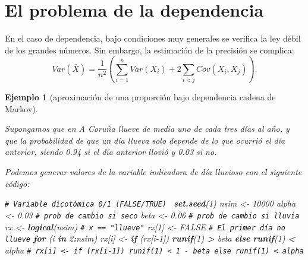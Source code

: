 \documentclass[
  spanish,
  10pt,
]{book}
\newenvironment{Shaded}{\begin{snugshade}}{\end{snugshade}}
\newcommand{\CommentTok}[1]{\textcolor[rgb]{0.56,0.35,0.01}{\textit{#1}}}
\newcommand{\ConstantTok}[1]{\textcolor[rgb]{0.56,0.35,0.01}{#1}}
\newcommand{\ControlFlowTok}[1]{\textcolor[rgb]{0.13,0.29,0.53}{\textbf{#1}}}
\newcommand{\DecValTok}[1]{\textcolor[rgb]{0.00,0.00,0.81}{#1}}
\newcommand{\FloatTok}[1]{\textcolor[rgb]{0.00,0.00,0.81}{#1}}
\newcommand{\FunctionTok}[1]{\textcolor[rgb]{0.13,0.29,0.53}{\textbf{#1}}}
\newcommand{\NormalTok}[1]{#1}
\newcommand{\OtherTok}[1]{\textcolor[rgb]{0.56,0.35,0.01}{#1}}
\newcommand{\SpecialCharTok}[1]{\textcolor[rgb]{0.81,0.36,0.00}{\textbf{#1}}}
\theoremstyle{break}
\newtheorem{example}{Ejemplo}[chapter]
\theoremstyle{nonumberplain}
\renewcommand{\CommentTok}[1]{\textcolor[rgb]{0.41,0.41,0.41}{\texttt{#1}}}
\begin{document}
\section{El problema de la dependencia}\label{el-problema-de-la-dependencia}

En el caso de dependencia, bajo condiciones muy generales se verifica la ley débil de los grandes números.
Sin embargo, la estimación de la precisión se complica:
\[Var\left( \overline{X}\right) =\frac{1}{n^{2}}\left( 
\sum_{i=1}^{n}Var\left( X_{i} \right) + 2\sum_{i<j}Cov\left( X_{i},X_{j}\right) \right).\]

\begin{example}[aproximación de una proporción bajo dependencia cadena de Markov]
\protect\hypertarget{exm:mmc}{}\label{exm:mmc}

Supongamos que en A Coruña llueve de media uno de cada tres días al año,
y que la probabilidad de que un día llueva solo depende de lo que ocurrió el día anterior,
siendo 0.94 si el día anterior llovió y 0.03 si no.

Podemos generar valores de la variable indicadora de día lluvioso con el siguiente código:

\begin{Shaded}
\begin{Highlighting}[]
\CommentTok{\# Variable dicotómica 0/1 (FALSE/TRUE)  }
\FunctionTok{set.seed}\NormalTok{(}\DecValTok{1}\NormalTok{)}
\NormalTok{nsim }\OtherTok{\textless{}{-}} \DecValTok{10000}
\NormalTok{alpha }\OtherTok{\textless{}{-}} \FloatTok{0.03} \CommentTok{\# prob de cambio si seco}
\NormalTok{beta }\OtherTok{\textless{}{-}} \FloatTok{0.06}  \CommentTok{\# prob de cambio si lluvia}
\NormalTok{rx }\OtherTok{\textless{}{-}} \FunctionTok{logical}\NormalTok{(nsim) }\CommentTok{\# x == "llueve"}
\NormalTok{rx[}\DecValTok{1}\NormalTok{] }\OtherTok{\textless{}{-}} \ConstantTok{FALSE} \CommentTok{\# El primer día no llueve}
\ControlFlowTok{for}\NormalTok{ (i }\ControlFlowTok{in} \DecValTok{2}\SpecialCharTok{:}\NormalTok{nsim)}
\NormalTok{  rx[i] }\OtherTok{\textless{}{-}} \ControlFlowTok{if}\NormalTok{ (rx[i}\DecValTok{{-}1}\NormalTok{]) }\FunctionTok{runif}\NormalTok{(}\DecValTok{1}\NormalTok{) }\SpecialCharTok{\textgreater{}}\NormalTok{ beta }\ControlFlowTok{else} \FunctionTok{runif}\NormalTok{(}\DecValTok{1}\NormalTok{) }\SpecialCharTok{\textless{}}\NormalTok{ alpha}
  \CommentTok{\# rx[i] \textless{}{-} if (rx[i{-}1]) runif(1) \textless{} 1 {-} beta else runif(1) \textless{} alpha}
\end{Highlighting}
\end{Shaded}


\end{example}
\end{document}
